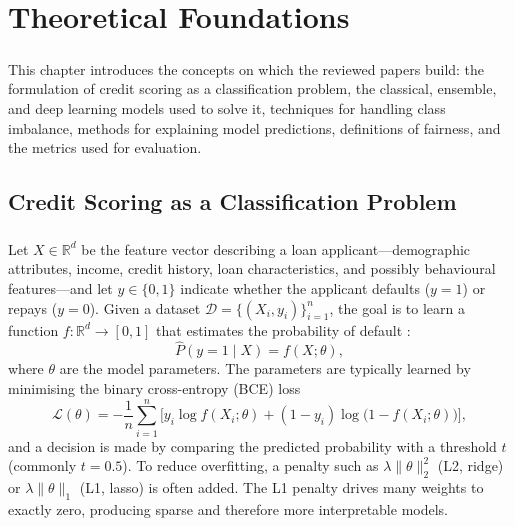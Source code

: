 \documentclass[12pt,a4paper,final]{extreport}
\begin{document}
\chapter{Theoretical Foundations}

\paragraph{} This chapter introduces the concepts on which the reviewed papers build: the formulation of credit scoring as a classification problem, the classical, ensemble, and deep learning models used to solve it, techniques for handling class imbalance, methods for explaining model predictions, definitions of fairness, and the metrics used for evaluation.

\section{Credit Scoring as a Classification Problem}

\paragraph{} Let $X\in\mathbb{R}^{d}$ be the feature vector describing a loan applicant---demographic attributes, income, credit history, loan characteristics, and possibly behavioural features---and let $y\in\{0,1\}$ indicate whether the applicant defaults ($y=1$) or repays ($y=0$). Given a dataset $\mathcal{D}=\{(X_i,y_i)\}_{i=1}^{n}$, the goal is to learn a function $f:\mathbb{R}^{d}\rightarrow[0,1]$ that estimates the probability of default \cite{p1}:
\begin{equation}
\hat{P}(y=1\mid X)=f(X;\theta),
\end{equation}
where $\theta$ are the model parameters. The parameters are typically learned by minimising the binary cross-entropy (BCE) loss
\begin{equation}
\mathcal{L}(\theta)=-\frac{1}{n}\sum_{i=1}^{n}\Big[y_i\log f(X_i;\theta)+(1-y_i)\log\big(1-f(X_i;\theta)\big)\Big],
\label{eq:bce}
\end{equation}
and a decision is made by comparing the predicted probability with a threshold $t$ (commonly $t=0.5$). To reduce overfitting, a penalty such as $\lambda\|\theta\|_2^2$ (L2, ridge) or $\lambda\|\theta\|_1$ (L1, lasso) is often added. The L1 penalty drives many weights to exactly zero, producing sparse and therefore more interpretable models.
\end{document}
